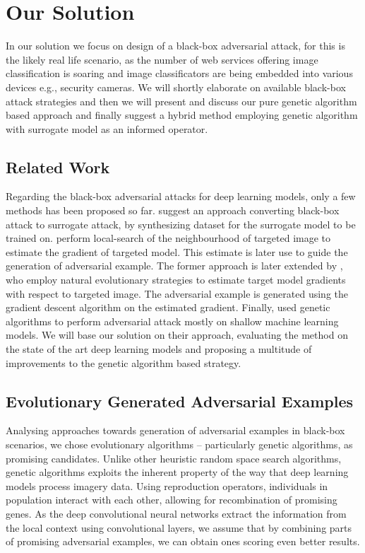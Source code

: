 \chapter{Our Solution}
\label{sec:solution}
In our solution we focus on design of a black-box adversarial attack, for this is the likely real life scenario, as the number of web services offering image classification is soaring and image classificators are being embedded into various devices e.g., security cameras. We will shortly elaborate on available black-box attack strategies and then we will present and discuss our pure genetic algorithm based approach and finally suggest a hybrid method employing genetic algorithm with surrogate model as an informed operator.

\section{Related Work}
Regarding the black-box adversarial attacks for deep learning models, only a few methods has been proposed so far. \cite{DBLP:journals/corr/PapernotMGJCS16} suggest an approach converting black-box attack to surrogate attack, by synthesizing dataset for the surrogate model to be trained on. \cite{8014906} perform local-search of the neighbourhood of targeted image to estimate the gradient of targeted model. This estimate is later use to guide the generation of adversarial example. The former approach is later extended by \cite{DBLP:journals/corr/abs-1804-08598}, who employ natural evolutionary strategies to estimate target model gradients with respect to targeted image. The adversarial example is generated using the gradient descent algorithm on the estimated gradient. Finally, \cite{Vidnerova:2016:EGA:2955129.2955178} used genetic algorithms to perform adversarial attack mostly on shallow machine learning models. We will base our solution on their approach, evaluating the method on the state of the art deep learning models and proposing a multitude of improvements to the genetic algorithm based strategy.

\section{Evolutionary Generated Adversarial Examples}
\label{sec:pga}
Analysing approaches towards generation of adversarial examples in black-box scenarios, we chose evolutionary algorithms -- particularly genetic algorithms, as promising candidates. Unlike other heuristic random space search algorithms, genetic algorithms exploits the inherent property of the way that deep learning models process imagery data. Using reproduction operators, individuals in population interact with each other, allowing for recombination of promising genes. As the deep convolutional neural networks extract the information from the local context using convolutional layers, we assume that by combining parts of promising adversarial examples, we can obtain ones scoring even better results.

